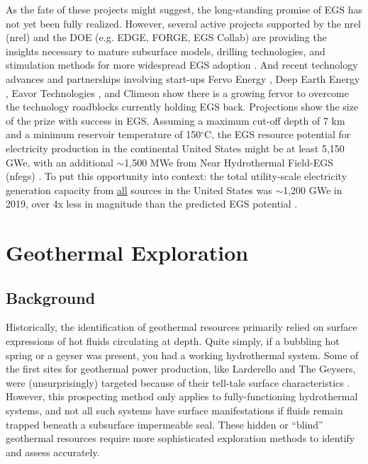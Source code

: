 As the fate of these projects might suggest, the long-standing promise of EGS has not yet been fully realized. However, several active projects supported by the \acrlong{nrel} (\acrshort{nrel}) and the DOE (e.g. EDGE, FORGE, EGS Collab) are providing the insights necessary to mature subsurface models, drilling technologies, and stimulation methods for more widespread EGS adoption \citep{hamm_geothermal_2021}. And recent technology advances and partnerships involving start-ups Fervo Energy \citep{moss_google_2021,shieber_geothermal_2021}, Deep Earth Energy \citep{geoenergy_saskatchewan_2021}, Eavor Technologies \citep{ross_energy_2020}, and Climeon \citep{climeon_climeon_2021,geoenergy_baseload_2020} show there is a growing fervor to overcome the technology roadblocks currently holding EGS back. Projections show the size of the prize with success in EGS. Assuming a maximum cut-off depth of 7 km and a minimum reservoir temperature of 150$^\circ$C, the EGS resource potential for electricity production in the continental United States might be at least 5,150 GWe, with an additional $\sim$1,500 MWe from Near Hydrothermal Field-EGS (\acrshort{nfegs}) \citep{augustine_geovision_2019}. To put this opportunity into context: the total utility-scale electricity generation capacity from \underline{all} sources in the United States was $\sim$1,200 GWe in 2019, over 4x less in magnitude than the predicted EGS potential \citep{eia_electric_2020}.

\section{Geothermal Exploration}\label{ch2:geoexp}
\subsection{Background}
Historically, the identification of geothermal resources primarily relied on surface expressions of hot fluids circulating at depth. Quite simply, if a bubbling hot spring or a geyser was present, you had a working hydrothermal system. Some of the first sites for geothermal power production, like Larderello and The Geysers, were (unsurprisingly) targeted because of their tell-tale surface characteristics \citep[~p. 111]{glassley_geothermal_2015}. However, this prospecting method only applies to fully-functioning hydrothermal systems, and not all such systems have surface manifestations if fluids remain trapped beneath a subsurface impermeable seal. These hidden or “blind” geothermal resources require more sophisticated exploration methods to identify and assess accurately.

